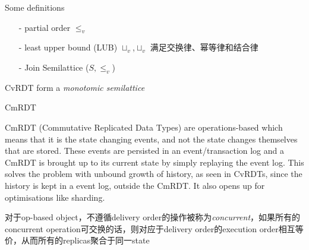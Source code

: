 \documentclass[UTF8,a4paper]{ctexart}
\begin{document}
	\noindent Some definitions
	\begin{itemize}
		\small\item[-] 	partial order $\le_v$
		\small\item[-]  least upper bound (LUB) $\sqcup_v$,$\sqcup_v$ 满足交换律、幂等律和结合律
		\small\item[-] Join Semilattice ($S,\le_v$)
	\end{itemize}
	 CvRDT form a \emph{monotomic semilattice}
	 
	\noindent CmRDT
	
	CmRDT (Commutative Replicated Data Types) are operations-based which means that it is the state changing events, and not the state changes themselves that are stored. These events are persisted in an event/transaction log and a CmRDT is brought up to its current state by simply replaying the event log. This solves the problem with unbound growth of history, as seen in CvRDTs, since the history is kept in a event log, outside the CmRDT. It also opens up for optimisations like sharding.
	
	对于op-based object，不遵循delivery order的操作被称为\emph{concurrent}，如果所有的concurrent operation可交换的话，则对应于delivery order的execution order相互等价，从而所有的replicas聚合于同一state 
	
	
	
	
	
\end{document}
